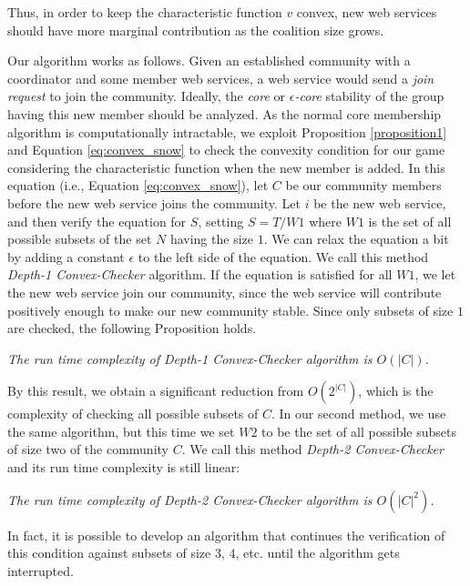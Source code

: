 \documentclass[10pt,journal,cspaper,compsoc]{IEEEtran}
\begin{document}
Thus, in order to keep the characteristic function $v$ convex, new
web services should have more marginal contribution as the
coalition size grows.

Our algorithm works as follows. Given an established community
with a coordinator and some member web services, a web service would
send a \emph{join request} to join  the community. Ideally, the
\emph{core} or \emph{$\epsilon$-core} stability of the group
having this new member should be analyzed. As the normal core
membership algorithm is computationally intractable, we exploit
Proposition \ref{proposition1} and Equation \ref{eq:convex_snow}
to check the convexity condition for our game considering the characteristic function 
when the new member is added. In this equation (i.e., Equation
\ref{eq:convex_snow}), let $C$ be our community members before the
new web service joins the community. Let  ${i}$ be the new web
service, and then verify the equation for $S$, setting $ S = T /
W1 $ where $W1$ is the set of all possible subsets of the set $N$
having the size $1$. We can relax the equation a bit by adding a
constant $\epsilon$ to the left side of the equation. We call this
method \emph{Depth-1 Convex-Checker} algorithm. If the equation is
satisfied for all $W1$, we let the new web service join our
community, since the web service will contribute positively enough
to make our new community stable. Since only subsets of size $1$
are checked, the following Proposition holds.

\begin{theorem}\label{complexity1}
\emph{The run time complexity of Depth-1 Convex-Checker algorithm
is $O(|C|)$.}
\end{theorem}

By this result, we obtain a significant reduction from
$O(2^{|C|})$, which is the complexity of checking all possible
subsets of $C$. In our second method, we use the same algorithm,
but this time we set $W2$ to be the set of all possible subsets of
size two of the community $C$. We call this method \emph{Depth-2
Convex-Checker} and its run time complexity is still linear:

\begin{theorem}\label{complexity2}
\emph{The run time complexity of Depth-2 Convex-Checker algorithm
is $O(|C|^2)$.}
\end{theorem}

In fact, it is possible to develop an algorithm that continues the
verification of this condition against subsets of size $3$, $4$,
etc. until the algorithm gets interrupted.
\end{document}

